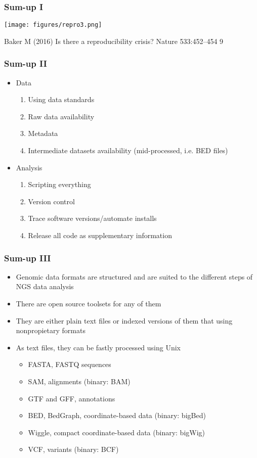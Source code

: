 \documentclass{beamer}
\begin{document}
\begin{frame}
  \frametitle{Sum-up I}
\centering
\texttt{[image: figures/repro3.png]}

{\tiny Baker M (2016) Is there a reproducibility crisis? Nature 533:452–454 9}
\end{frame}



\begin{frame}
  \frametitle{Sum-up II}
  \begin{itemize}
  \item Data
    \begin{enumerate}
    \item Using data standards
    \item Raw data availability
    \item Metadata
    \item Intermediate datasets availability (mid-processed, i.e. BED files)
    \end{enumerate}
  \item Analysis
    \begin{enumerate}
    \item Scripting everything
    \item Version control
    \item Trace software versions/automate installs
    \item Release all code as supplementary information
    \end{enumerate}
  \end{itemize}
\end{frame}


\begin{frame}
  \frametitle{Sum-up III}

  \begin{itemize}
  \item Genomic data formats are structured and are suited to the different steps of NGS data analysis
  \item There are open source toolsets for any of them
  \item They are either plain text files or indexed versions of them that using nonpropietary formats
  \item As text files, they can be fastly processed using Unix
    \begin{itemize}
    \item FASTA, FASTQ sequences
    \item SAM, alignments (binary: BAM)
    \item GTF and GFF, annotations
    \item BED, BedGraph, coordinate-based data (binary: bigBed)
    \item Wiggle, compact coordinate-based data (binary: bigWig)
    \item VCF, variants (binary: BCF)
    \end{itemize}
  \end{itemize}

\end{frame}
\end{document}
